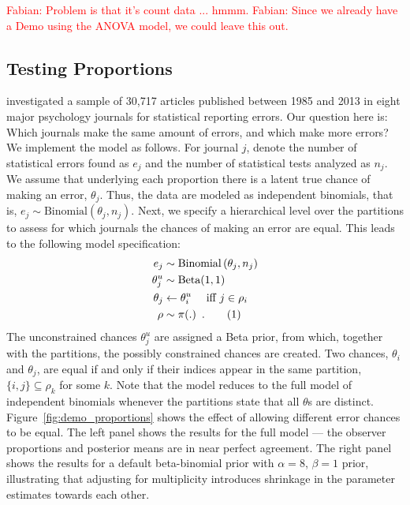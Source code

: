 \documentclass[11pt,a4paper]{article}
\theoremstyle{definition} %
\theoremstyle{case}
\newcommand{\numberthis}{\addtocounter{equation}{1}\tag{\theequation}}
\newcommand{\FD}[1]{\textcolor{red}{Fabian: #1 }}
\begin{document}
\FD{Problem is that it's count data ... hmmm.}
\FD{Since we already have a Demo using the ANOVA model, we could leave this out.}
\fi


\subsection{Testing Proportions}
\textcite{nuijten2016prevalence} investigated a sample of 30,717 articles published between 1985 and 2013 in eight major psychology journals for statistical reporting errors. Our question here is: Which journals make the same amount of errors, and which make more errors? We implement the model as follows. For journal $j$, denote the number of statistical errors found as $e_j$ and the number of statistical tests analyzed as $n_j$. We assume that underlying each proportion there is a latent true chance of making an error, $\theta_j$. Thus, the data are modeled as independent binomials, that is, $e_j \sim \mathrm{Binomial}\left(\theta_j, n_j\right)$. Next, we specify a hierarchical level over the partitions to assess for which journals the chances of making an error are equal. This leads to the following model specification:
\begin{align*}
    e_j                 &\sim \mathrm{Binomial}\left(\theta_j, n_j\right)\\
    \theta^u_j          &\sim \text{Beta}(1, 1)\\
    \theta_j            &\leftarrow \theta^u_i \quad\text{ iff } j \in \rho_i\\
    \rho                &\sim \pi(.) \enspace . \numberthis
\end{align*}
The unconstrained chances $\theta^u_j$ are assigned a Beta prior, from which, together with the partitions, the possibly constrained chances are created. Two chances, $\theta_i$ and $\theta_j$, are equal if and only if their indices appear in the same partition, $\{i, j\} \subseteq \rho_k$ for some $k$. Note that the model reduces to the full model of independent binomials whenever the partitions state that all $\theta$s are distinct. Figure~\ref{fig:demo_proportions} shows the effect of allowing different error chances to be equal. The left panel shows the results for the full model --- the observer proportions and posterior means are in near perfect agreement. The right panel shows the results for a default beta-binomial prior with $\alpha = 8$, $\beta = 1$ prior, illustrating that adjusting for multiplicity introduces shrinkage in the parameter estimates towards each other. 
\end{document}
